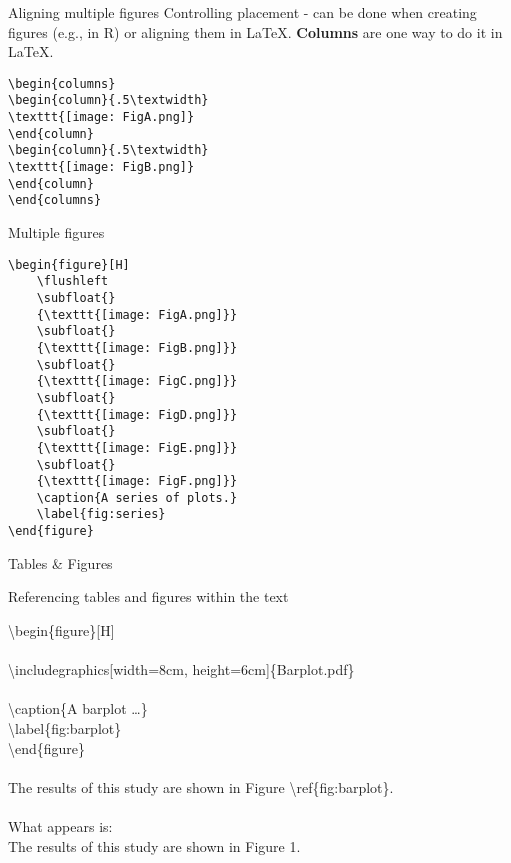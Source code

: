 \documentclass[xcolor=dvipsnames]{beamer}
\begin{document}
\begin{frame}[fragile]{Aligning multiple figures}
Controlling placement - can be done when creating figures (e.g., in R) or aligning them in LaTeX. \textbf{Columns} are one way to do it in LaTeX.

\begin{verbatim}
\begin{columns}
\begin{column}{.5\textwidth}
\texttt{[image: FigA.png]}
\end{column}
\begin{column}{.5\textwidth}
\texttt{[image: FigB.png]}
\end{column}
\end{columns}
\end{verbatim} 

\end{frame}

\begin{frame}[fragile]{Multiple figures}

{\small
\begin{verbatim}
\begin{figure}[H]
	\flushleft
	\subfloat{}
	{\texttt{[image: FigA.png]}}
	\subfloat{}
	{\texttt{[image: FigB.png]}}
	\subfloat{}
	{\texttt{[image: FigC.png]}}
	\subfloat{}
	{\texttt{[image: FigD.png]}}
	\subfloat{}
	{\texttt{[image: FigE.png]}}
	\subfloat{}
	{\texttt{[image: FigF.png]}}
	\caption{A series of plots.} 
	\label{fig:series}
\end{figure}
\end{verbatim}
}
\end{frame}

\begin{frame}{\LARGE{Tables \& Figures}}

{\Large Referencing tables and figures within the text}

 \textbackslash begin\{figure\}[H]\\~\\
 \textbackslash includegraphics[width=8cm, height=6cm]\{Barplot.pdf\}\\~\\
 
 
     \textbackslash caption\{A barplot \dots\}~\\
            \textbackslash label\{fig:barplot\}~\\
         \textbackslash end\{figure\} ~\\~\\

The results of this study are shown in Figure \textbackslash ref\{fig:barplot\}.\\~\\

What appears is:\\
The results of this study are shown in Figure 1.
\end{frame}
\end{document}
